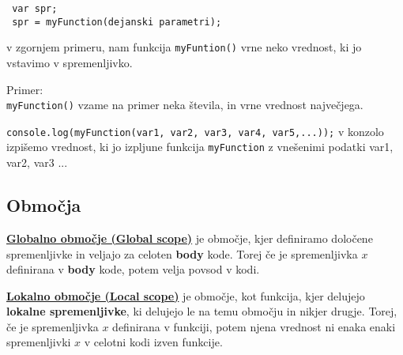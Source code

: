 \begin{verbatim}
 var spr;
 spr = myFunction(dejanski parametri);
\end{verbatim}
v zgornjem primeru, nam funkcija \texttt{myFuntion()} vrne neko vrednost, ki jo vstavimo v spremenljivko.

Primer:\\
\texttt{myFunction()} vzame na primer neka števila, in vrne vrednost največjega.

\texttt{console.log(myFunction(var1, var2, var3, var4, var5,...));} v konzolo izpišemo vrednost, ki jo izpljune funkcija \texttt{myFunction} z vnešenimi podatki var1, var2, var3 ...

\subsection*{Območja}

\underline{\textbf{Globalno območje (Global scope)}} je območje, kjer definiramo določene spremenljivke in veljajo za celoten \textbf{body} kode. Torej če je spremenljivka $x$ definirana v \textbf{body} kode, potem velja povsod v kodi.

\textbf{\underline{Lokalno območje (Local scope)}} je območje, kot funkcija, kjer delujejo \textbf{lokalne spremenljivke}, ki delujejo le na temu območju in nikjer drugje. Torej, če je spremenljivka $x$ definirana v funkciji, potem njena vrednost ni enaka enaki spremenljivki $x$ v celotni kodi izven funkcije.

